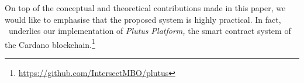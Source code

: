 On top of the conceptual and theoretical contributions made in this paper, we would like to emphasise that the proposed system is highly practical. In fact, \EUTXOma\ underlies our implementation of \emph{Plutus Platform,} the smart contract system of the Cardano blockchain.\footnote{\url{https://github.com/IntersectMBO/plutus}}
